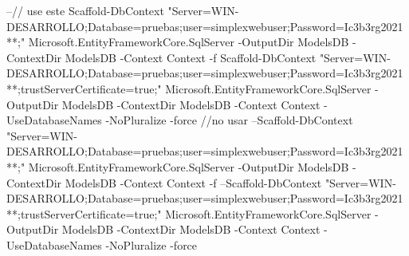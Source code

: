 --// use este
Scaffold-DbContext "Server=WIN-DESARROLLO\DEVSQLSERVER;Database=pruebas;user=simplexwebuser;Password=Ic3b3rg2021**;" Microsoft.EntityFrameworkCore.SqlServer -OutputDir ModelsDB -ContextDir ModelsDB -Context Context -f
Scaffold-DbContext "Server=WIN-DESARROLLO\DEVSQLSERVER;Database=pruebas;user=simplexwebuser;Password=Ic3b3rg2021**;trustServerCertificate=true;" Microsoft.EntityFrameworkCore.SqlServer -OutputDir ModelsDB -ContextDir ModelsDB -Context Context -UseDatabaseNames -NoPluralize -force
//no usar
--Scaffold-DbContext "Server=WIN-DESARROLLO\DEVSQLSERVER;Database=pruebas;user=simplexwebuser;Password=Ic3b3rg2021**;" Microsoft.EntityFrameworkCore.SqlServer -OutputDir ModelsDB -ContextDir ModelsDB -Context Context -f
--Scaffold-DbContext "Server=WIN-DESARROLLO\DEVSQLSERVER;Database=pruebas;user=simplexwebuser;Password=Ic3b3rg2021**;trustServerCertificate=true;" Microsoft.EntityFrameworkCore.SqlServer -OutputDir ModelsDB -ContextDir ModelsDB -Context Context -UseDatabaseNames -NoPluralize -force

